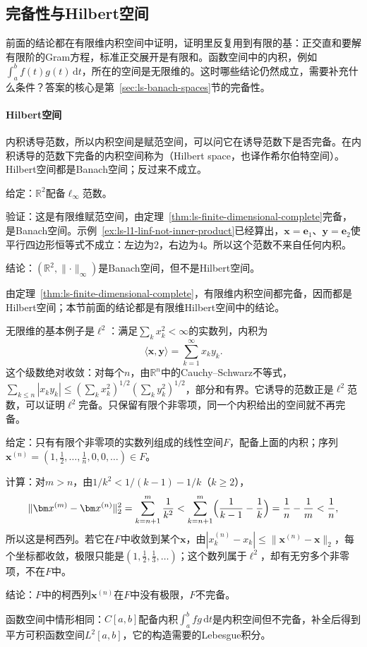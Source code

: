 \subsection{完备性与Hilbert空间}
\label{sec:ls-hilbert-spaces}

前面的结论都在有限维内积空间中证明，证明里反复用到有限的基：正交直和要解有限阶的Gram方程，标准正交展开是有限和。函数空间中的内积，例如$\int_a^bf(t)g(t)\,\mathrm dt$，所在的空间是无限维的。这时哪些结论仍然成立，需要补充什么条件？答案的核心是第~\ref{sec:ls-banach-spaces}节的完备性。

\paragraph{Hilbert空间}
内积诱导范数，所以内积空间是赋范空间，可以问它在诱导范数下是否完备。在内积诱导的范数下完备的内积空间称为（Hilbert space，也译作希尔伯特空间）。Hilbert空间都是Banach空间；反过来不成立。
\begin{example}[反例：完备但不来自内积的范数]
\label{ex:ls-banach-not-hilbert}
给定：$\mathbb R^2$配备$\ell_\infty$范数。

验证：这是有限维赋范空间，由定理~\ref{thm:ls-finite-dimensional-complete}完备，是Banach空间。示例~\ref{ex:ls-l1-linf-not-inner-product}已经算出，$\bm x=\bm e_1$、$\bm y=\bm e_2$使平行四边形恒等式不成立：左边为$2$，右边为$4$。所以这个范数不来自任何内积。

结论：$(\mathbb R^2,\lVert\cdot\rVert_\infty)$是Banach空间，但不是Hilbert空间。
\end{example}
由定理~\ref{thm:ls-finite-dimensional-complete}，有限维内积空间都完备，因而都是Hilbert空间；本节前面的结论都是有限维Hilbert空间中的结论。

无限维的基本例子是$\ell^2$：满足$\sum_kx_k^2<\infty$的实数列，内积为
\[
 \langle\bm x,\bm y\rangle=\sum_{k=1}^\infty x_ky_k .
\]
这个级数绝对收敛：对每个$n$，由$\mathbb R^n$中的Cauchy--Schwarz不等式，$\sum_{k\leq n}|x_ky_k|\leq(\sum_kx_k^2)^{1/2}(\sum_ky_k^2)^{1/2}$，部分和有界。它诱导的范数正是$\ell^2$范数，可以证明$\ell^2$完备。只保留有限个非零项，同一个内积给出的空间就不再完备。
\begin{example}[反例：有限非零数列的空间不完备]
\label{ex:ls-finite-sequences-incomplete}
给定：只有有限个非零项的实数列组成的线性空间$F$，配备上面的内积；序列$\bm x^{(n)}=(1,\tfrac12,\ldots,\tfrac1n,0,0,\ldots)\in F$。

计算：对$m>n$，由$1/k^2<1/(k-1)-1/k$（$k\geq2$），
\[
 \lVert\bm x^{(m)}-\bm x^{(n)}\rVert_2^2=\sum_{k=n+1}^m\frac1{k^2}
 <\sum_{k=n+1}^m\Bigl(\frac1{k-1}-\frac1k\Bigr)=\frac1n-\frac1m<\frac1n,
\]
所以这是柯西列。若它在$F$中收敛到某个$\bm x$，由$|x^{(n)}_k-x_k|\leq\lVert\bm x^{(n)}-\bm x\rVert_2$，每个坐标都收敛，极限只能是$(1,\tfrac12,\tfrac13,\ldots)$；这个数列属于$\ell^2$，却有无穷多个非零项，不在$F$中。

结论：$F$中的柯西列$\bm x^{(n)}$在$F$中没有极限，$F$不完备。
\end{example}
函数空间中情形相同：$C[a,b]$配备内积$\int_a^bfg\,\mathrm dt$是内积空间但不完备，补全后得到平方可积函数空间$L^2[a,b]$，它的构造需要的Lebesgue积分。


